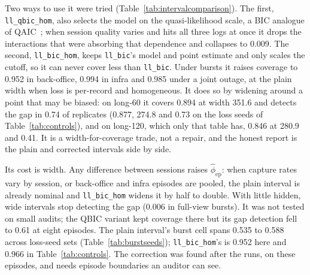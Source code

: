 \documentclass[11pt]{article}
\begin{document}
Two ways to use it were tried (Table~\ref{tab:intervalcomparison}). The first,
\texttt{ll\_qbic\_hom}, also selects the model on the quasi-likelihood scale, a
BIC analogue of QAIC~\citep{anderson1994overdispersed}; when session quality
varies and hits all three logs at once it drops the interactions that were
absorbing that dependence and collapses to 0.009. The second,
\texttt{ll\_bic\_hom}, keeps \texttt{ll\_bic}'s model and point estimate and only
scales the cutoff, so it can never cover less than \texttt{ll\_bic}. Under bursts
it raises coverage to 0.952 in back-office, 0.994 in infra and 0.985 under a joint
outage, at the plain width when loss is per-record and homogeneous. It does so by
widening around a point that may be biased: on long-60 it covers 0.894 at width
351.6 and detects the gap in 0.74 of replicates (0.877, 274.8 and 0.73 on the
loss seeds of Table~\ref{tab:controls}), and on long-120, which only that table has,
0.846 at 280.9 and 0.41. It is a width-for-coverage trade, not a repair, and the honest
report is the plain and corrected intervals side by side.

\begin{table}[h]
\centering

\caption{Three intervals against the losses that broke them. Post hoc.}
\label{tab:intervalcomparison}
\end{table}

Its cost is width. Any difference between sessions raises
$\hat\phi_{\mathrm{ep}}$: when capture rates vary by session, or back-office and
infra episodes are pooled, the plain interval is already nominal and
\texttt{ll\_bic\_hom} widens it by half to double. With little hidden, wide
intervals stop detecting the gap (0.006 in full-view bursts). It was not tested
on small audits; the QBIC variant kept coverage there but its gap detection fell
to 0.61 at eight episodes. The plain interval's burst cell spans 0.535 to 0.588 across loss-seed
sets (Table~\ref{tab:burstseeds}); \texttt{ll\_bic\_hom}'s is 0.952 here and 0.966 in
Table~\ref{tab:controls}. The correction was found after the runs,
on these episodes, and needs episode boundaries an auditor can see.
\end{document}
